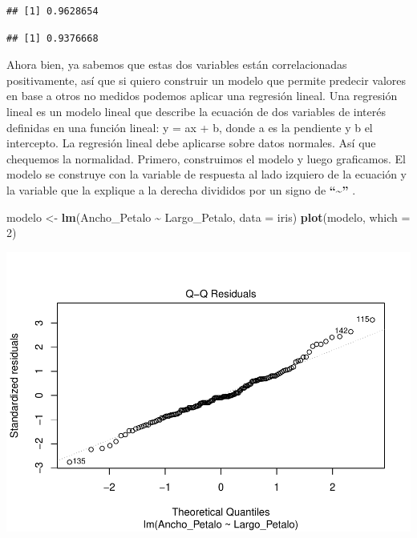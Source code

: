 \documentclass[
]{book}
\newenvironment{Shaded}{\begin{snugshade}}{\end{snugshade}}
\newcommand{\AttributeTok}[1]{\textcolor[rgb]{0.13,0.29,0.53}{#1}}
\newcommand{\CommentTok}[1]{\textcolor[rgb]{0.56,0.35,0.01}{\textit{#1}}}
\newcommand{\DecValTok}[1]{\textcolor[rgb]{0.00,0.00,0.81}{#1}}
\newcommand{\FunctionTok}[1]{\textcolor[rgb]{0.13,0.29,0.53}{\textbf{#1}}}
\newcommand{\NormalTok}[1]{#1}
\newcommand{\OtherTok}[1]{\textcolor[rgb]{0.56,0.35,0.01}{#1}}
\newcommand{\SpecialCharTok}[1]{\textcolor[rgb]{0.81,0.36,0.00}{\textbf{#1}}}
\newcommand{\StringTok}[1]{\textcolor[rgb]{0.31,0.60,0.02}{#1}}
\begin{document}
\begin{verbatim}
## [1] 0.9628654
\end{verbatim}

\begin{Shaded}
\end{Shaded}

\begin{verbatim}
## [1] 0.9376668
\end{verbatim}

\hfill\break
Ahora bien, ya sabemos que estas dos variables están correlacionadas positivamente, así que si quiero construir un modelo que permite predecir valores en base a otros no medidos podemos aplicar una regresión lineal.
Una regresión lineal es un modelo lineal que describe la ecuación de dos variables de interés definidas en una función lineal: y = ax + b, donde a es la pendiente y b el intercepto.
La regresión lineal debe aplicarse sobre datos normales.
Así que chequemos la normalidad.
Primero, construimos el modelo y luego graficamos.
El modelo se construye con la variable de respuesta al lado izquiero de la ecuación y la variable que la explique a la derecha divididos por un signo de \textbf{``\textasciitilde{}''} .\\

\begin{Shaded}
\begin{Highlighting}[]
\NormalTok{modelo }\OtherTok{\textless{}{-}} \FunctionTok{lm}\NormalTok{(Ancho\_Petalo }\SpecialCharTok{\textasciitilde{}}\NormalTok{ Largo\_Petalo, }\AttributeTok{data =}\NormalTok{ iris) }
\FunctionTok{plot}\NormalTok{(modelo, }\AttributeTok{which =} \DecValTok{2}\NormalTok{)}
\end{Highlighting}
\end{Shaded}

\includegraphics{_main_files/figure-latex/unnamed-chunk-253-1.pdf}
\end{document}
